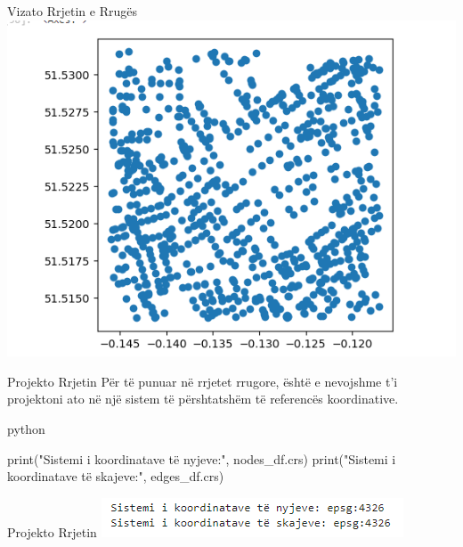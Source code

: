 \documentclass[
  ignorenonframetext,
]{beamer}
\newenvironment{Shaded}{\begin{snugshade}}{\end{snugshade}}
\newcommand{\BuiltInTok}[1]{#1}
\newcommand{\NormalTok}[1]{#1}
\newcommand{\StringTok}[1]{\textcolor[rgb]{0.31,0.60,0.02}{#1}}
\begin{document}
\begin{frame}{Vizato Rrjetin e Rrugës}
\protect\hypertarget{vizato-rrjetin-e-rruguxebs-9}{}
\includegraphics{./Figs/rrjetirrugor1.png}
\end{frame}

\begin{frame}[fragile]{Projekto Rrjetin}
\protect\hypertarget{projekto-rrjetin}{}
Për të punuar në rrjetet rrugore, është e nevojshme t'i projektoni ato
në një sistem të përshtatshëm të referencës koordinative.

python

\begin{Shaded}
\begin{Highlighting}[]
\BuiltInTok{print}\NormalTok{(}\StringTok{"Sistemi i koordinatave të nyjeve:"}\NormalTok{, nodes\_df.crs)}
\BuiltInTok{print}\NormalTok{(}\StringTok{"Sistemi i koordinatave të skajeve:"}\NormalTok{, edges\_df.crs)}
\end{Highlighting}
\end{Shaded}
\end{frame}

\begin{frame}{Projekto Rrjetin}
\protect\hypertarget{projekto-rrjetin-1}{}
\includegraphics{./Figs/rrjetikor.png}
\end{frame}
\end{document}
